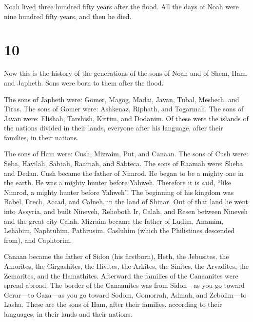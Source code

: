  Noah lived three hundred fifty years after the flood.
 All the days of Noah were nine hundred fifty years, and
then he died.

\hypertarget{section-9}{%
\section{10}\label{section-9}}

 Now this is the history of the generations of the sons of
Noah and of Shem, Ham, and Japheth. Sons were born to them after the
flood.

 The sons of Japheth were: Gomer, Magog, Madai, Javan,
Tubal, Meshech, and Tiras.  The sons of Gomer were:
Ashkenaz, Riphath, and Togarmah.  The sons of Javan were:
Elishah, Tarshish, Kittim, and Dodanim.  Of these were the
islands of the nations divided in their lands, everyone after his
language, after their families, in their nations.

 The sons of Ham were: Cush, Mizraim, Put, and Canaan.
 The sons of Cush were: Seba, Havilah, Sabtah, Raamah, and
Sabteca. The sons of Raamah were: Sheba and Dedan.  Cush
became the father of Nimrod. He began to be a mighty one in the earth.
 He was a mighty hunter before Yahweh. Therefore it is
said, ``like Nimrod, a mighty hunter before Yahweh''. 
The beginning of his kingdom was Babel, Erech, Accad, and Calneh, in the
land of Shinar.  Out of that land he went into Assyria,
and built Nineveh, Rehoboth Ir, Calah,  and Resen between
Nineveh and the great city Calah.  Mizraim became the
father of Ludim, Anamim, Lehabim, Naphtuhim,  Pathrusim,
Casluhim (which the Philistines descended from), and Caphtorim.

 Canaan became the father of Sidon (his firstborn), Heth,
 the Jebusites, the Amorites, the Girgashites,
 the Hivites, the Arkites, the Sinites, 
the Arvadites, the Zemarites, and the Hamathites. Afterward the families
of the Canaanites were spread abroad.  The border of the
Canaanites was from Sidon---as you go toward Gerar---to Gaza---as you go
toward Sodom, Gomorrah, Admah, and Zeboiim---to Lasha. 
These are the sons of Ham, after their families, according to their
languages, in their lands and their nations.

